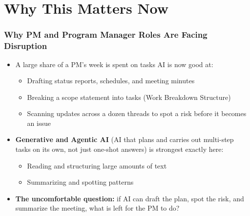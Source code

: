
\section[Why]{Why This Matters Now}
%

\begin{frame}[fragile]\frametitle{Why PM and Program Manager Roles Are Facing Disruption}

\begin{itemize}
  \item A large share of a PM's week is spent on tasks AI is now good at:
    \begin{itemize}
      \item Drafting status reports, schedules, and meeting minutes
      \item Breaking a scope statement into tasks (Work Breakdown Structure)
      \item Scanning updates across a dozen threads to spot a risk before it becomes an issue
    \end{itemize}
  \item \textbf{Generative and Agentic AI} (AI that plans and carries out multi-step tasks on its own, not just one-shot answers) is strongest exactly here:
    \begin{itemize}
      \item Reading and structuring large amounts of text
      \item Summarizing and spotting patterns
    \end{itemize}
  \item \textbf{The uncomfortable question:} if AI can draft the plan, spot the risk, and summarize the meeting, what is left for the PM to do?
\end{itemize}

\end{frame}

